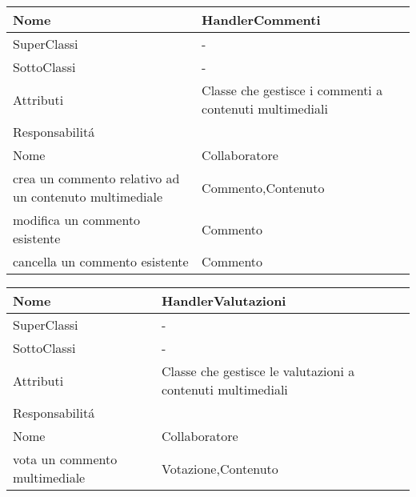 \begin{center}
    \begin{tabular}{ |p{3cm}|p{3cm}|p{3cm}|p{3cm}| }
        \hline
        Nome & \multicolumn{3}{|p{9cm}|}{HandlerCommenti} \\\hline
        SuperClassi & \multicolumn{3}{|p{9cm}|}{-} \\\hline
        SottoClassi & \multicolumn{3}{|p{9cm}|}{-} \\\hline
        Attributi & \multicolumn{3}{|p{9cm}|}{Classe che gestisce i commenti a contenuti multimediali} \\\hline
        \multicolumn{4}{|p{12cm}|}{Responsabilit\'a} \\\hline
        \multicolumn{2}{|p{6cm}|}{Nome} & \multicolumn{2}{|p{6cm}|}{Collaboratore} \\\hline
        \multicolumn{2}{|p{6cm}|}{crea un commento relativo ad un contenuto multimediale} & \multicolumn{2}{|p{6cm}|}{Commento,Contenuto} \\\hline
        \multicolumn{2}{|p{6cm}|}{modifica un commento esistente} & \multicolumn{2}{|p{6cm}|}{Commento} \\\hline
        \multicolumn{2}{|p{6cm}|}{cancella un commento esistente} & \multicolumn{2}{|p{6cm}|}{Commento} \\\hline
    \end{tabular}
\end{center}

\begin{center}
    \begin{tabular}{ |p{3cm}|p{3cm}|p{3cm}|p{3cm}| }
        \hline
        Nome & \multicolumn{3}{|p{9cm}|}{HandlerValutazioni} \\\hline
        SuperClassi & \multicolumn{3}{|p{9cm}|}{-} \\\hline
        SottoClassi & \multicolumn{3}{|p{9cm}|}{-} \\\hline
        Attributi & \multicolumn{3}{|p{9cm}|}{Classe che gestisce le valutazioni a contenuti multimediali} \\\hline
        \multicolumn{4}{|p{12cm}|}{Responsabilit\'a} \\\hline
        \multicolumn{2}{|p{6cm}|}{Nome} & \multicolumn{2}{|p{6cm}|}{Collaboratore} \\\hline
        \multicolumn{2}{|p{6cm}|}{vota un commento multimediale} & \multicolumn{2}{|p{6cm}|}{Votazione,Contenuto} \\\hline
    \end{tabular}
\end{center}

